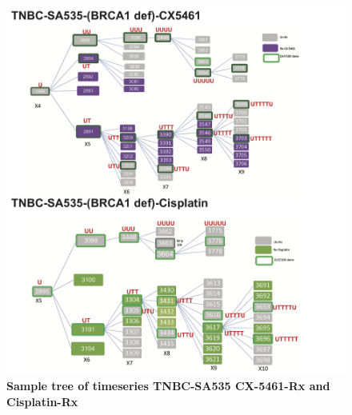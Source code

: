\begin{figure}
\centering
\includegraphics[width=\textwidth]{Figures/SampletreeSA535.png}
  \caption[Sample tree of timeseries TNBC-SA535 CX-5461-Rx and Cisplatin-Rx]
	{\small
	\textbf{Sample tree of timeseries TNBC-SA535 CX-5461-Rx and Cisplatin-Rx }
}
    \label{fig:SampletreeSA535cisCX}
    \end{figure}








